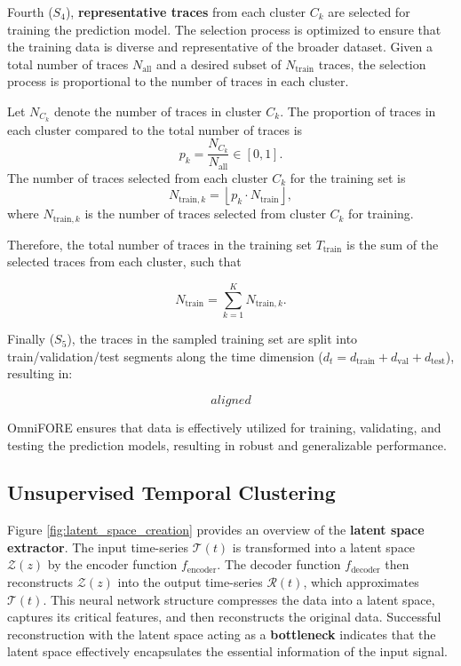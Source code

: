 \documentclass{ieeetmlcn}
\begin{document}
Fourth ($S_4$), \textbf{representative traces} from each cluster $C_k$ are selected for training the prediction model. The selection process is optimized to ensure that the training data is diverse and representative of the broader dataset. Given a total number of traces $N_{\text{all}}$ and a desired subset of $N_{\text{train}}$ traces, the selection process is proportional to the number of traces in each cluster.

Let $N_{C_k}$ denote the number of traces in cluster $C_k$. The proportion of traces in each cluster compared to the total number of traces is
\begin{equation}
p_k = \frac{N_{C_k}}{N_{\text{all}}} \in \left[ 0, 1 \right].
\end{equation}
The number of traces selected from each cluster $C_k$ for the training set is
\begin{equation}
N_{\text{train},k} = \left\lfloor p_k \cdot N_{\text{train}} \right\rfloor,
\end{equation}
where $N_{\text{train},k}$ is the number of traces selected from cluster $C_k$ for training.

Therefore, the total number of traces in the training set $T_{\text{train}}$ is the sum of the selected traces from each cluster, such that

\begin{equation}  
N_{\text{train}} = \sum_{k=1}^{K} N_{\text{train},k}.
\end{equation}

Finally ($S_5$), the traces in the sampled training set are split into train/validation/test segments along the time dimension ($d_t = d_{\text{train}} + d_{\text{val}} + d_{\text{test}}$), resulting in:

\begin{equation}
\begin{equation*}
aligned
\end{equation*} 
\end{equation}

OmniFORE ensures that data is effectively utilized for training, validating, and testing the prediction models, resulting in robust and generalizable performance.

\subsection{Unsupervised Temporal Clustering}
\label{sec: Unsupervised Temporal Clustering}

Figure \ref{fig:latent_space_creation} provides an overview of the \textbf{latent space extractor}. The input time-series $\mathcal{T}(t)$ is transformed into a latent space $\mathcal{Z}(z)$ by the encoder function $f_{\text{encoder}}$. The decoder function $f_{\text{decoder}}$ then reconstructs $\mathcal{Z}(z)$ into the output time-series $\mathcal{R}(t)$, which approximates $\mathcal{T}(t)$. This neural network structure compresses the data into a latent space, captures its critical features, and then reconstructs the original data. Successful reconstruction with the latent space acting as a \textbf{bottleneck} indicates that the latent space effectively encapsulates the essential information of the input signal.
\end{document}

